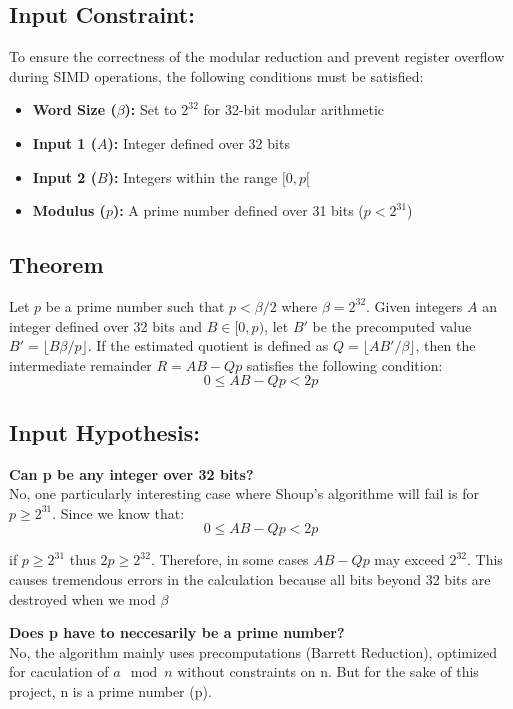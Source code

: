 \documentclass{article}
\begin{document}
\subsection{Input Constraint:}
To ensure the correctness of the modular reduction and prevent register overflow during SIMD operations,
the following conditions must be satisfied:
\begin{itemize}
    \item \textbf{Word Size ($\beta$):} Set to $2^{32}$ for 32-bit modular arithmetic
    \item \textbf{Input 1 ($A$):} Integer defined over 32 bits
    \item \textbf{Input 2 ($B$):} Integers within the range $[0, p[$
    \item \textbf{Modulus ($p$):} A prime number defined over 31 bits ($p < 2^{31}$)
\end{itemize}

\subsection{Theorem}
Let $p$ be a prime number such that $p < \beta/2$ where $\beta = 2^{32}$. Given integers $A$ an integer defined over 32 bits and
$ B \in [0, p)$, let $B'$ be the precomputed value $B' = \lfloor B\beta/p \rfloor$.
If the estimated quotient is defined as $Q = \lfloor AB'/\beta \rfloor$, then the intermediate remainder $R = AB - Qp$ satisfies the following condition:
$$0 \le AB - Qp < 2p$$

\subsection{Input Hypothesis:}
\textbf{Can p be any integer over 32 bits?} \\
No, one particularly interesting case where Shoup's algorithme will fail is for $p \ge 2^{31}$.
Since we know that:
$$0 \le AB - Qp < 2p$$

if $p \ge 2^{31}$ thus $2p \ge 2^{32}$. Therefore, in some cases $AB - Qp$ may exceed $2^{32}$. This causes tremendous errors in the calculation because
all bits beyond 32 bits are destroyed when we mod $\beta$

\textbf{Does p have to neccesarily be a prime number?} \\
No, the algorithm mainly uses precomputations (Barrett Reduction), optimized for caculation of $a \mod n$ without constraints on n.
But for the sake of this project, n is a prime number (p).
\end{document}
